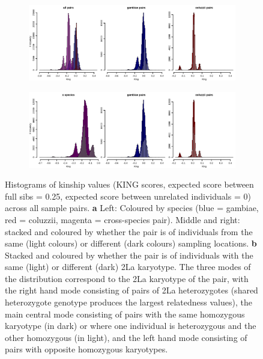 \documentclass[a4paper,12pt]{article}
\begin{document}
\begin{figure}[h]
	\hspace*{-1cm}
	\begin{minipage}{\textwidth}
		\begin{subfigure}{\textwidth}
			\subcaption{}
			\includegraphics*[width = 7in]{../../NGSrelate/full_relatedness/king_histograms.png}
		\end{subfigure}\par
		\begin{subfigure}{\textwidth}
			\subcaption{}
			\includegraphics*[width = 7in]{../../NGSrelate/full_relatedness/king_histograms_karyotype.png}
		\end{subfigure}
	\end{minipage}
	\caption{\footnotesize Histograms of kinship values (KING scores, expected score between full sibs = 0.25, expected score between unrelated individuals = 0) across all sample pairs. \textbf{a} Left: Coloured by species (blue = gambiae, red = coluzzii, magenta = cross-species pair). Middle and right: stacked and coloured by whether the pair is of individuals from the same (light colours) or different (dark colours) sampling locations. \textbf{b} Stacked and coloured by whether the pair is of individuals with the same (light) or different (dark) 2La karyotype. The three modes of the distribution correspond to the 2La karyotype of the pair, with the right hand mode consisting of pairs of 2La heterozygotes (shared heterozygote genotype produces the largest relatedness values), the main central mode consisting of pairs with the same homozygous karyotype (in dark) or where one individual is heterozygous and the other homozygous (in light), and the left hand mode consisting of pairs with opposite homozygous karyotypes.}
	\label{FigM2}
\end{figure}
\end{document}
